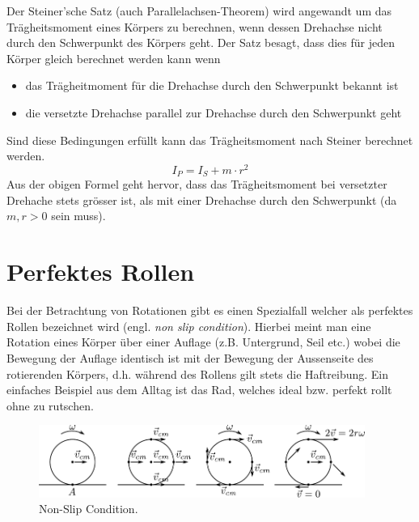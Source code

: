 \noindent
Der Steiner'sche Satz (auch Parallelachsen-Theorem) wird angewandt um
das Trägheitsmoment eines Körpers zu berechnen, wenn dessen Drehachse nicht
durch den Schwerpunkt des Körpers geht. Der Satz besagt, dass dies für 
jeden Körper gleich berechnet werden kann wenn
\begin{itemize}
	\item das Trägheitmoment für die Drehachse durch den Schwerpunkt
		bekannt ist
	\item die versetzte Drehachse parallel zur Drehachse durch den
		Schwerpunkt geht
\end{itemize}
Sind diese Bedingungen erfüllt kann das Trägheitsmoment nach Steiner
berechnet werden.
\[ \boxed{ I_P = I_S + m \cdot r^2 } \]
Aus der obigen Formel geht hervor, dass das Trägheitsmoment bei versetzter
Drehache stets grösser ist, als mit einer Drehachse durch den Schwerpunkt
(da $m,r>0$ sein muss).

\newpage
\section{Perfektes Rollen}
Bei der Betrachtung von Rotationen gibt es einen Spezialfall welcher
als perfektes Rollen bezeichnet wird (engl. \textit{non slip condition}).
Hierbei meint man eine Rotation eines Körper über einer Auflage (z.B. 
Untergrund, Seil etc.) wobei die Bewegung der Auflage identisch ist
mit der Bewegung der Aussenseite des rotierenden Körpers, d.h. während
des Rollens gilt stets die Haftreibung. Ein einfaches Beispiel aus dem
Alltag ist das Rad, welches ideal bzw. perfekt rollt ohne zu rutschen.

\begin{figure}[h!]
	\centering
	\includegraphics[width=0.95\textwidth]{non-slip.pdf}
	\caption{Non-Slip Condition.}
	\label{fig:non-slip}
\end{figure}

